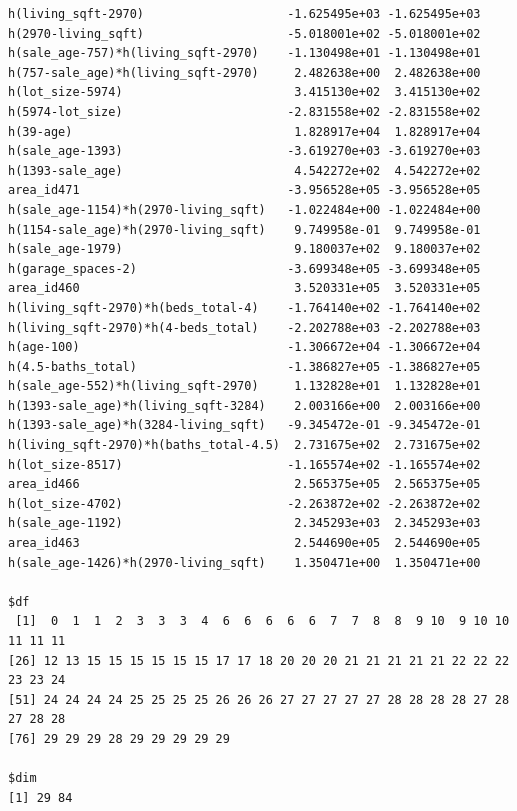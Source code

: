 \documentclass[
]{article}
\begin{document}
\begin{verbatim}
h(living_sqft-2970)                    -1.625495e+03 -1.625495e+03
h(2970-living_sqft)                    -5.018001e+02 -5.018001e+02
h(sale_age-757)*h(living_sqft-2970)    -1.130498e+01 -1.130498e+01
h(757-sale_age)*h(living_sqft-2970)     2.482638e+00  2.482638e+00
h(lot_size-5974)                        3.415130e+02  3.415130e+02
h(5974-lot_size)                       -2.831558e+02 -2.831558e+02
h(39-age)                               1.828917e+04  1.828917e+04
h(sale_age-1393)                       -3.619270e+03 -3.619270e+03
h(1393-sale_age)                        4.542272e+02  4.542272e+02
area_id471                             -3.956528e+05 -3.956528e+05
h(sale_age-1154)*h(2970-living_sqft)   -1.022484e+00 -1.022484e+00
h(1154-sale_age)*h(2970-living_sqft)    9.749958e-01  9.749958e-01
h(sale_age-1979)                        9.180037e+02  9.180037e+02
h(garage_spaces-2)                     -3.699348e+05 -3.699348e+05
area_id460                              3.520331e+05  3.520331e+05
h(living_sqft-2970)*h(beds_total-4)    -1.764140e+02 -1.764140e+02
h(living_sqft-2970)*h(4-beds_total)    -2.202788e+03 -2.202788e+03
h(age-100)                             -1.306672e+04 -1.306672e+04
h(4.5-baths_total)                     -1.386827e+05 -1.386827e+05
h(sale_age-552)*h(living_sqft-2970)     1.132828e+01  1.132828e+01
h(1393-sale_age)*h(living_sqft-3284)    2.003166e+00  2.003166e+00
h(1393-sale_age)*h(3284-living_sqft)   -9.345472e-01 -9.345472e-01
h(living_sqft-2970)*h(baths_total-4.5)  2.731675e+02  2.731675e+02
h(lot_size-8517)                       -1.165574e+02 -1.165574e+02
area_id466                              2.565375e+05  2.565375e+05
h(lot_size-4702)                       -2.263872e+02 -2.263872e+02
h(sale_age-1192)                        2.345293e+03  2.345293e+03
area_id463                              2.544690e+05  2.544690e+05
h(sale_age-1426)*h(2970-living_sqft)    1.350471e+00  1.350471e+00

$df
 [1]  0  1  1  2  3  3  3  4  6  6  6  6  6  7  7  8  8  9 10  9 10 10 11 11 11
[26] 12 13 15 15 15 15 15 15 17 17 18 20 20 20 21 21 21 21 21 22 22 22 23 23 24
[51] 24 24 24 24 25 25 25 25 26 26 26 27 27 27 27 27 28 28 28 28 27 28 27 28 28
[76] 29 29 29 28 29 29 29 29 29

$dim
[1] 29 84


\end{verbatim}
\end{document}
